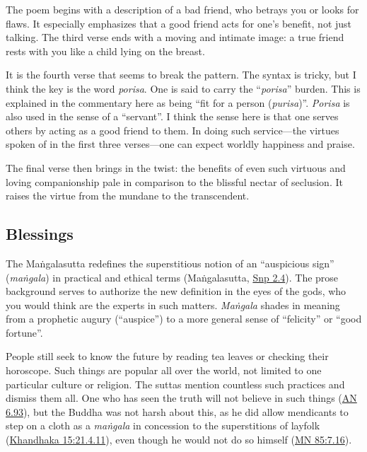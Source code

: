 \documentclass[12pt,openany]{book}%
\begin{document}
The poem begins with a description of a bad friend, who betrays you or looks for flaws. It especially emphasizes that a good friend acts for one’s benefit, not just talking. The third verse ends with a moving and intimate image: a true friend rests with you like a child lying on the breast.

It is the fourth verse that seems to break the pattern. The syntax is tricky, but I think the key is the word \textit{porisa}. One is said to carry the “\textit{porisa}” burden. This is explained in the commentary here as being “fit for a person (\textit{purisa})”. \textit{Porisa} is also used in the sense of a “servant”. I think the sense here is that one serves others by acting as a good friend to them. In doing such service—the virtues spoken of in the first three verses—one can expect worldly happiness and praise.

The final verse then brings in the twist: the benefits of even such virtuous and loving companionship pale in comparison to the blissful nectar of seclusion. It raises the virtue from the mundane to the transcendent.

\subsection*{Blessings}

The \textsanskrit{Maṅgalasutta} redefines the superstitious notion of an “auspicious sign” (\textit{\textsanskrit{maṅgala}}) in practical and ethical terms (\textsanskrit{Maṅgalasutta}, \href{https://suttacentral.net/snp2.4/en/sujato}{Snp 2.4}). The prose background serves to authorize the new definition in the eyes of the gods, who you would think are the experts in such matters. \textit{\textsanskrit{Maṅgala}} shades in meaning from a prophetic augury (“auspice”) to a more general sense of “felicity” or “good fortune”.

People still seek to know the future by reading tea leaves or checking their horoscope. Such things are popular all over the world, not limited to one particular culture or religion. The suttas mention countless such practices and dismiss them all. One who has seen the truth will not believe in such things (\href{https://suttacentral.net/an6.93/en/sujato}{AN 6.93}), but the Buddha was not harsh about this, as he did allow mendicants to step on a cloth as a \textit{\textsanskrit{maṅgala}} in concession to the superstitions of layfolk (\href{https://suttacentral.net/pli-tv-kd15/en/brahmali\#21.4.11}{Khandhaka 15:21.4.11}), even though he would not do so himself (\href{https://suttacentral.net/mn85/en/sujato\#7.16}{MN 85:7.16}).
\end{document}
